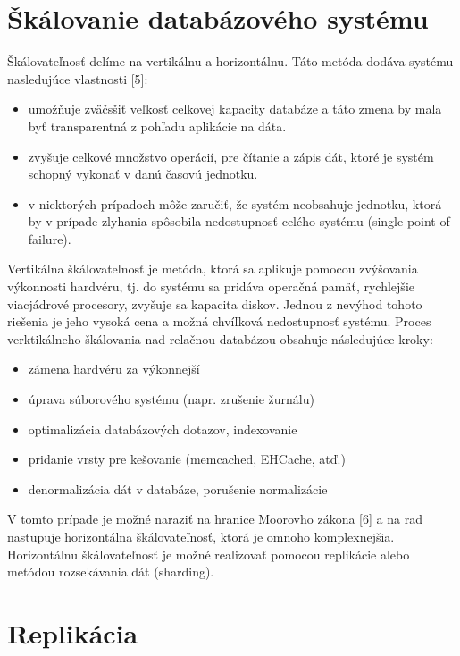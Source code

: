 \documentclass[11pt,twoside,a4paper]{book}
\begin{document}
\section{Škálovanie databázového systému}

Škálovateľnosť delíme na vertikálnu a horizontálnu. Táto metóda dodáva systému nasledujúce vlastnosti [5]:
\begin{itemize}
 \item umožňuje zväčsšiť veľkosť celkovej kapacity databáze a táto zmena by mala byť transparentná z pohľadu aplikácie na dáta.
  \item zvyšuje celkové množstvo operácií, pre čítanie a zápis dát, ktoré je systém schopný vykonať v danú časovú jednotku.
  \item v niektorých prípadoch môže zaručiť, že systém neobsahuje jednotku, ktorá by v prípade zlyhania spôsobila nedostupnosť celého systému (single point of failure).
\end{itemize}

Vertikálna škálovateľnosť je metóda, ktorá sa aplikuje pomocou zvýšovania výkonnosti hardvéru, tj. do systému sa pridáva operačná pamäť, rychlejšie viacjádrové procesory, zvyšuje sa kapacita diskov. Jednou z nevýhod tohoto riešenia je jeho vysoká cena a možná chvíľková nedostupnosť systému. 
Proces verktikálneho škálovania nad relačnou databázou obsahuje následujúce kroky:
\begin{itemize}
 \item zámena hardvéru za výkonnejší
 \item úprava súborového systému (napr. zrušenie žurnálu)
 \item optimalizácia databázových dotazov, indexovanie
 \item pridanie vrsty pre kešovanie (memcached, EHCache, atď.)
 \item denormalizácia dát v databáze, porušenie normalizácie
\end{itemize}

V tomto prípade je možné naraziť na hranice Moorovho zákona [6] a na rad nastupuje horizontálna škálovateľnosť, ktorá je omnoho komplexnejšia. Horizontálnu škálovateľnosť je možné realizovať pomocou replikácie alebo metódou rozsekávania dát (sharding).

\section{Replikácia}
\end{document}
